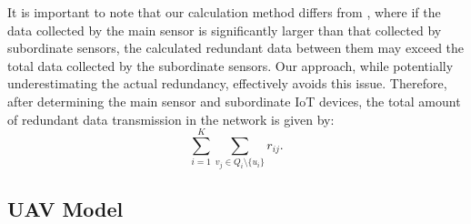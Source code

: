 \documentclass[sigconf]{acmart}
\begin{document}
It is important to note that our calculation method differs from \cite{8-Minimizing_redundant}, where if the data collected by the main sensor is significantly larger than that collected by subordinate sensors, the calculated redundant data between them may exceed the total data collected by the subordinate sensors. Our approach, while potentially underestimating the actual redundancy, effectively avoids this issue. Therefore, after determining the main sensor and subordinate IoT devices, the total amount of redundant data transmission in the network is given by:
\begin{equation}
    \sum_{i=1}^K\sum_{v_j\in Q_i\setminus\{u_i\}}r_{ij}.
\end{equation}

\subsection{UAV Model}




\end{document}
